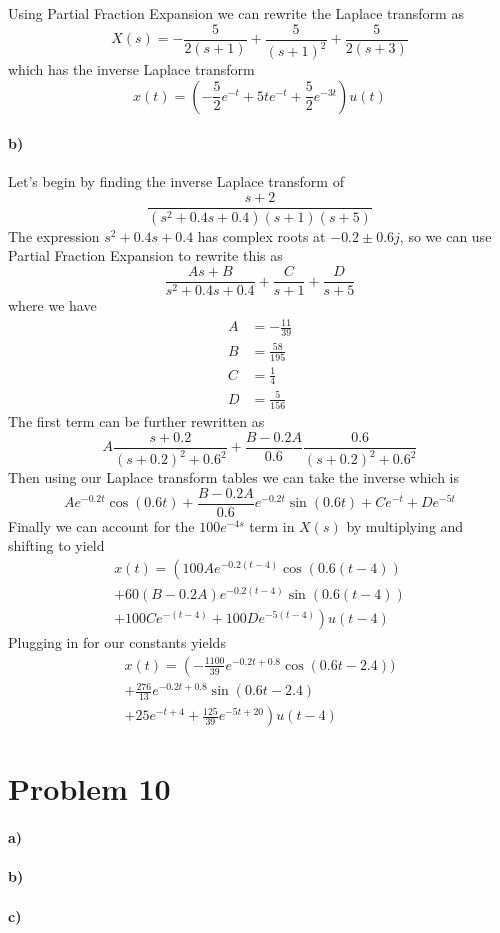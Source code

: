 \documentclass[12pt]{article}
\begin{document}
Using Partial Fraction Expansion we can rewrite the Laplace transform as
\[X(s)=-\frac{5}{2(s+1)} + \frac{5}{(s+1)^2} + \frac{5}{2(s+3)}\]
which has the inverse Laplace transform
\[x(t)=\left(-\frac{5}{2}e^{-t} + 5te^{-t} + \frac{5}{2}e^{-3t}\right)u(t)\]

\paragraph{b)}

Let's begin by finding the inverse Laplace transform of
\[\frac{s+2}{(s^2+0.4s+0.4)(s+1)(s+5)}\]
The expression \(s^2+0.4s+0.4\) has complex roots at \(-0.2\pm 0.6j\), so we can use Partial Fraction Expansion to rewrite this as
\[\frac{As+B}{s^2+0.4s+0.4}+\frac{C}{s+1}+\frac{D}{s+5}\]
where we have
\begin{align*}
    A&=-\frac{11}{39}\\
    B&=\frac{58}{195}\\
    C&=\frac{1}{4}\\
    D&=\frac{5}{156}
\end{align*}
The first term can be further rewritten as
\[A\frac{s+0.2}{(s+0.2)^2+0.6^2} + \frac{B-0.2A}{0.6}\frac{0.6}{(s+0.2)^2+0.6^2}\]
Then using our Laplace transform tables we can take the inverse which is
\[Ae^{-0.2t}\cos(0.6t)+\frac{B-0.2A}{0.6}e^{-0.2t}\sin(0.6t)+Ce^{-t}+De^{-5t}\]
Finally we can account for the \(100e^{-4s}\) term in \(X(s)\) by multiplying and shifting to yield
\begin{multline*}
    x(t)=\left(100Ae^{-0.2(t-4)}\cos(0.6(t-4))\right.\\
    +60(B-0.2A)e^{-0.2(t-4)}\sin(0.6(t-4))\\
    \left.+100Ce^{-(t-4)}+100De^{-5(t-4)}\right)u(t-4)
\end{multline*}
Plugging in for our constants yields
\begin{multline*}
    x(t)=\left(-\frac{1100}{39}e^{-0.2t+0.8}\cos(0.6t-2.4))\right.\\
    +\frac{276}{13}e^{-0.2t+0.8}\sin(0.6t-2.4)\\
    \left.+25e^{-t+4}+\frac{125}{39}e^{-5t+20}\right)u(t-4)
\end{multline*}

\section*{Problem 10}

\paragraph{a)}

\paragraph{b)}

\paragraph{c)}
\end{document}
